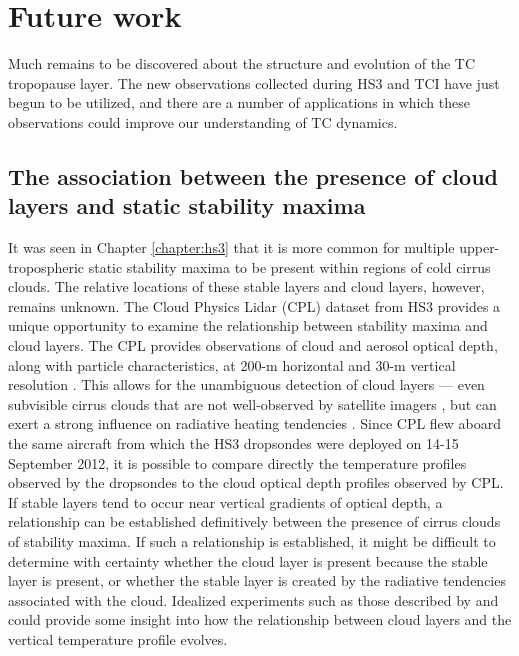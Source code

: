 \section{Future work}

Much remains to be discovered about the structure and evolution of the TC tropopause layer.
The new observations collected during HS3 and TCI have just begun to be utilized, and there are a number of applications in which these observations could improve our understanding of TC dynamics.

\subsection{The association between the presence of cloud layers and static stability maxima}

It was seen in Chapter \ref{chapter:hs3} that it is more common for multiple upper-tropospheric static stability maxima to be present within regions of cold cirrus clouds.
The relative locations of these stable layers and cloud layers, however, remains unknown.
The Cloud Physics Lidar (CPL) dataset from HS3 provides a unique opportunity to examine the relationship between stability maxima and cloud layers.
The CPL provides observations of cloud and aerosol optical depth, along with particle characteristics, at 200-m horizontal and 30-m vertical resolution \citep{CPL}.
This allows for the unambiguous detection of cloud layers --- even subvisible cirrus clouds that are not well-observed by satellite imagers \cite{Braunetal2016}, but can exert a strong influence on radiative heating tendencies \cite{Durranetal2009}.
Since CPL flew aboard the same aircraft from which the HS3 dropsondes were deployed on 14-15 September 2012, it is possible to compare directly the temperature profiles observed by the dropsondes to the cloud optical depth profiles observed by CPL.
If stable layers tend to occur near vertical gradients of optical depth, a relationship can be established definitively between the presence of cirrus clouds of stability maxima.
If such a relationship is established, it might be difficult to determine with certainty whether the cloud layer is present because the stable layer is present, or whether the stable layer is created by the radiative tendencies associated with the cloud.
Idealized experiments such as those described by \cite{Durranetal2009} and \cite{Dinhetal2010} could provide some insight into how the relationship between cloud layers and the vertical temperature profile evolves.

